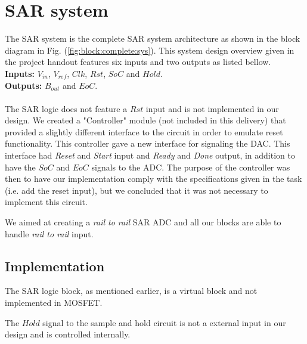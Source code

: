 \documentclass[english, 12pt, a4paper]{ifimaster}
\begin{document}
\section{SAR system}
The SAR system is the complete SAR system architecture as shown in the block diagram in Fig. (\ref{fig:block:complete:sys}).
This system design overview given in the project handout features six inputs and two outputs as listed bellow.\\

\noindent \textbf{Inputs:} \(V_{in}\), \(V_{ref}\), \(Clk\), \(Rst\), \(SoC\) and \(Hold\).\\
\noindent \textbf{Outputs:} \(B_{out}\) and \(EoC\).\\
\\
The SAR logic does not feature a \(Rst\) input and is not implemented in our design. 
We created a "Controller" module (not included in this delivery) that provided a slightly different interface to the circuit in order to emulate reset functionality.
This controller gave a new interface for signaling the DAC.
This interface had \textit{Reset} and \textit{Start} input and \textit{Ready} and \textit{Done} output, in addition to have the \(SoC\) and \(EoC\) signals to the ADC.
The purpose of the controller was then to have our implementation comply with the specifications given in the task (i.e. add the reset input), but we concluded that it was not necessary to implement this circuit.

We aimed at creating a \textit{rail to rail} SAR ADC and all our blocks are able to handle \textit{rail to rail} input.

\subsection{Implementation}
The SAR logic block, as mentioned earlier, is a virtual block and not implemented in MOSFET. 

The \(Hold\) signal to the sample and hold circuit is not a external input in our design and is controlled internally.
\end{document}
